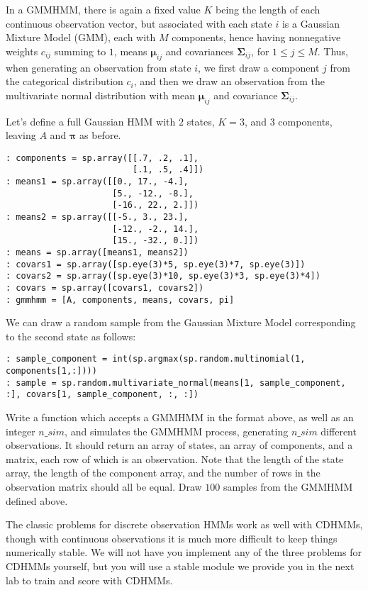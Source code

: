 In a GMMHMM, there is again a fixed value $K$ being the length of each continuous observation vector, but associated with each state $i$ is a Gaussian Mixture Model (GMM), each with $M$ components, hence having nonnegative weights $c_{ij}$ summing to $1$, means $\mathbf{\mu}_{ij}$ and covariances $\mathbf{\Sigma}_{ij}$, for $1 \leq j \leq M$. Thus, when generating an observation from state $i$, we first draw a component $j$ from the categorical distribution $c_{i}$, and then we draw an observation from the multivariate normal distribution with mean $\mathbf{\mu}_{ij}$ and covariance $\mathbf{\Sigma}_{ij}$.

Let's define a full Gaussian HMM with $2$ states, $K = 3$, and $3$ components, leaving $A$ and $\mathbf{\pi}$ as before.

\begin{lstlisting}[style=python]
: components = sp.array([[.7, .2, .1],
                         [.1, .5, .4]])
: means1 = sp.array([[0., 17., -4.],
                     [5., -12., -8.],
                     [-16., 22., 2.]])
: means2 = sp.array([[-5., 3., 23.],
                     [-12., -2., 14.],
                     [15., -32., 0.]])
: means = sp.array([means1, means2])
: covars1 = sp.array([sp.eye(3)*5, sp.eye(3)*7, sp.eye(3)])
: covars2 = sp.array([sp.eye(3)*10, sp.eye(3)*3, sp.eye(3)*4])
: covars = sp.array([covars1, covars2])
: gmmhmm = [A, components, means, covars, pi]
\end{lstlisting}

We can draw a random sample from the Gaussian Mixture Model corresponding to the second state as follows:

\begin{lstlisting}[style=python]
: sample_component = int(sp.argmax(sp.random.multinomial(1, components[1,:])))
: sample = sp.random.multivariate_normal(means[1, sample_component, :], covars[1, sample_component, :, :])
\end{lstlisting}

\begin{problem}
Write a function which accepts a GMMHMM in the format above, as well as an integer $n\_sim$, and simulates the GMMHMM process, generating $n\_sim$ different observations. It should return an array of states, an array of components, and a matrix, each row of which is an observation. Note that the length of the state array, the length of the component array, and the number of rows in the observation matrix should all be equal. Draw $100$ samples from the GMMHMM defined above.
\end{problem}

The classic problems for discrete observation HMMs work as well with CDHMMs, though with continuous observations it is much more difficult to keep things numerically stable. We will not have you implement any of the three problems for CDHMMs yourself, but you will use a stable module we provide you in the next lab to train and score with CDHMMs.